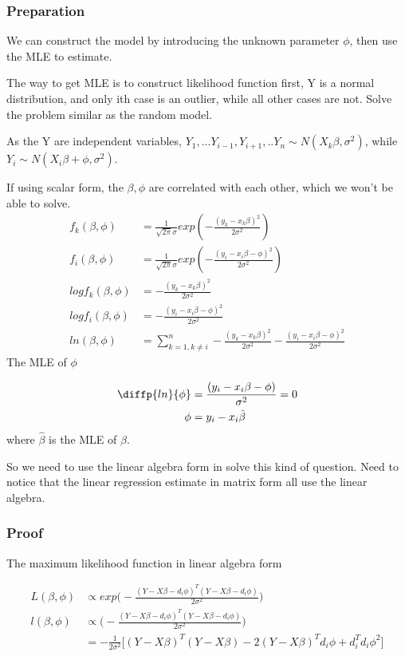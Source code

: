 \documentclass[11pt]{article} %
\begin{document}
\subsubsection{Preparation}
We can construct the model by introducing the unknown parameter $\phi$, then use the MLE to estimate.

The way to get MLE is to construct likelihood function first, Y is a normal distribution, and only ith case is an outlier, while all other cases are not. Solve the problem similar as the random model.

As the Y are independent variables, $Y_1, ... Y_{i-1}, Y_{i+1}, ..Y_{n} \sim N(X_k \beta, \sigma^2)$, while 
$Y_{i} \sim N(X_i \beta + \phi, \sigma^2)$.

If using scalar form, the $\beta , \phi$ are correlated with each other, which we won't be able to solve. 
\begin{align*}
	f_k(\beta, \phi) &= \frac{1}{\sqrt{2\pi} \sigma} exp(-\frac{(y_k - x_k \beta)^2}{2 \sigma^2}) \\
	f_i(\beta, \phi) &= \frac{1}{\sqrt{2\pi} \sigma} exp(-\frac{(y_i - x_i \beta - \phi)^2}{2 \sigma^2}) \\
	log f_k(\beta, \phi)  &= -\frac{(y_k - x_k \beta)^2}{2 \sigma^2} \\
	log f_i(\beta, \phi)  &= -\frac{(y_i - x_i \beta - \phi)^2}{2 \sigma^2} \\
	ln (\beta, \phi) &= \sum_{k=1, k \neq i} ^{n} -\frac{(y_k - x_k \beta)^2}{2 \sigma^2} -\frac{(y_i - x_i \beta - \phi)^2}{2 \sigma^2} 
\end{align*}
The MLE of $\phi$

\begin{align*}
	\diffp{ln}{\phi}  &=\frac{(y_i - x_i \beta - \phi)}{\sigma^2} = 0\\
	\phi &= y_i - x_i \hat{\beta}\\
\end{align*}
where $\hat{\beta}$ is the MLE of $\beta$. 

So we need to use the linear algebra form in solve this kind of question. Need to notice that the linear regression estimate in matrix form all use the linear algebra. 

\subsubsection{Proof}
The maximum likelihood function in linear algebra form

\begin{align*}
	L (\beta, \phi) & \propto exp \Bigg( -\frac{(Y- X\beta -d_i \phi)^T (Y- X\beta -d_i \phi)}{2 \sigma^2}  \Bigg) \\
	l (\beta, \phi) & \propto \Bigg( -\frac{(Y- X\beta -d_i \phi)^T (Y- X\beta -d_i \phi)}{2 \sigma^2}  \Bigg) \\
	&= -\frac{1}{2\sigma^2} \Big[(Y-X\beta)^T (Y-X\beta) -2 (Y-X\beta)^T d_i \phi + d_i^T d_i \phi^2 \Big]
\end{align*}
\end{document}
